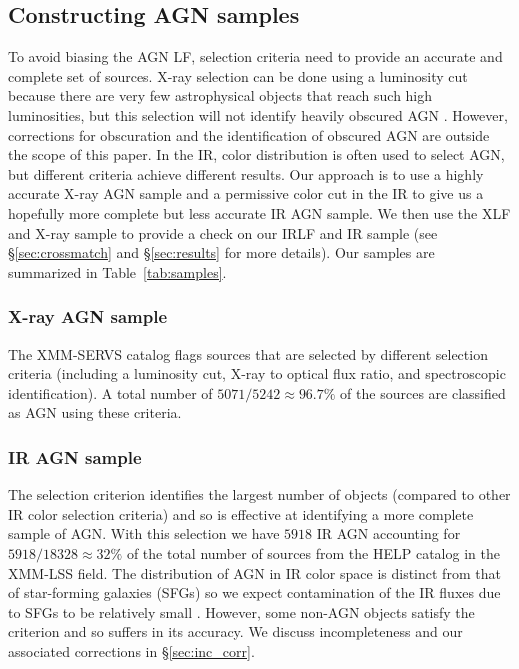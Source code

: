 \documentclass[twocolumn, trackchanges]{aastex63}
\begin{document}
\subsection{Constructing AGN samples}
\label{sec:selectir}
To avoid biasing the AGN LF, selection criteria need to provide an accurate and complete set of sources.
X-ray selection can be done using a luminosity cut because there are very few astrophysical objects that reach such high luminosities, but this selection will not identify heavily obscured AGN \citep{brandt2015A&ARv..23....1B, almeida_nuclear_2017}.
However, corrections for obscuration and the identification of obscured AGN are outside the scope of this paper.
In the IR, color distribution is often used to select AGN, but different criteria \citep{lacy_obscured_2004, donley_identifying_2012, stern_mid-infrared_2005} achieve different results. 
Our approach is to use a highly accurate X-ray AGN sample and a permissive color cut in the IR to give us a hopefully more complete but less accurate IR AGN sample.
We then use the XLF and X-ray sample to provide a check on our IRLF and IR sample (see \S\ref{sec:crossmatch} and \S\ref{sec:results} for more details).
Our samples are summarized in Table~\ref{tab:samples}.

\subsubsection{X-ray AGN sample}
\label{sec:xsample}
The XMM-SERVS catalog flags sources that are selected by different selection criteria (including a luminosity cut, X-ray to optical flux ratio, and spectroscopic identification).
A total number of $5071/5242 \approx 96.7\%$ of the sources are classified as AGN using these criteria. 

\subsubsection{IR AGN sample}
\label{sec:irsample}
The \cite{lacy_obscured_2004} selection criterion identifies the largest number of objects (compared to other IR color selection criteria) and so is effective at identifying a more complete sample of AGN.
With this selection we have $5918$ IR AGN accounting for $5918/18328 \approx 32\%$ of the total number of sources from the HELP catalog in the XMM-LSS field.
The distribution of AGN in IR color space is distinct from that of star-forming galaxies (SFGs) so we expect contamination of the IR fluxes due to SFGs to be relatively small \citep{sajina_simulating_2005, lacy_spitzer_2015}.
However, some non-AGN objects satisfy the criterion and so suffers in its accuracy.
We discuss incompleteness and our associated corrections in \S\ref{sec:inc_corr}.
\end{document}
